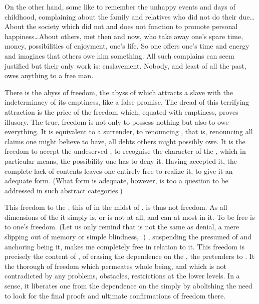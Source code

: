 On the other hand, some like to remember the unhappy events and days of
childhood, complaining about the family and relatives who did not do their
due\ldots About the society which did not and does not function to promote personal
happiness\ldots About others, met then and now, who take away one's spare time,
money, possibilities of enjoyment, one's life.  So one offers one's time and
energy and imagines that others owe him something.  All such complains can seem
justified but their only work is: enslavement.  Nobody, and least of all the
past, owes anything to a free man.

\pa There is the abyss of freedom, the abyss of  which attracts
a slave with the indeterminacy of its emptiness, like a false promise. The dread
of this terrifying attraction is the price of the freedom which, equated with
emptiness, proves illusory.  The true,  freedom is not only to
possess nothing but also to owe everything. It is equivalent to a surrender, to
renouncing , that is, renouncing all claims one might believe to
have, all debts others might possibly owe. It is the freedom to accept the
undeserved , to recognise the  character of the
, which in particular means, the possibility one has to deny it.
Having accepted it, the complete lack of  contents leaves one
entirely free to realize it, to give it an adequate  form. (What form
is adequate, however, is too  a question to be addressed in such
abstract categories.) 

This freedom to  the , this  of
 in the midst of , is thus not  freedom.
As all dimensions of the  it simply is, or is not at all, and
 can at most  in it.  To be free is to  one's
freedom. (Let us only remind that  is not the same as denial,
a mere slipping out of memory or simple blindness, .)  \yes,
suspending the presumed  of  and anchoring
 being  it, makes me completely free in relation to it.  This
freedom is precisely the content of , of erasing the
dependence on the , the  pretenders to .
It  the thorough  of freedom which permeates 
whole being, and which is not contradicted by any problems, obstacles,
restrictions at the lower levels. In a sense, it liberates one from the
dependence on the  simply by abolishing the need to look for
the final proofs and ultimate confirmations of freedom there.

